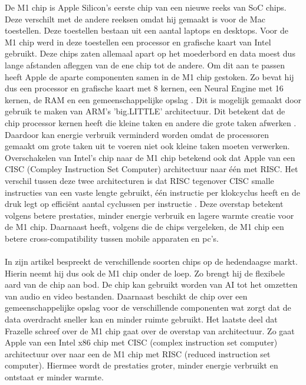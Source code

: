 \documentclass{hogent-article}
\begin{document}


De M1 chip is Apple Silicon's eerste chip van een nieuwe reeks van SoC chips. Deze verschilt met de andere reeksen omdat hij gemaakt is voor de Mac toestellen. Deze toestellen bestaan uit een aantal laptops en desktops. Voor de M1 chip werd in deze toestellen een processor en grafische kaart van Intel gebruikt. Deze chips zaten allemaal apart op het moederbord en data moest dus lange afstanden afleggen van de ene chip tot de andere. Om dit aan te passen heeft Apple de aparte componenten samen in de M1 chip gestoken. Zo bevat hij dus een processor en grafische kaart met 8 kernen, een Neural Engine met 16 kernen, de RAM en een gemeenschappelijke opslag \autocite{Apple2020}. Dit is mogelijk gemaakt door gebruik te maken van ARM's 'big.LITTLE' architectuur. Dit betekent dat de chip processor kernen heeft die kleine taken en andere die grote taken afwerken \autocite{ARM2014}. Daardoor kan energie verbruik verminderd worden omdat de processoren gemaakt om grote taken uit te voeren niet ook kleine taken moeten verwerken. \\
Overschakelen van Intel's chip naar de M1 chip betekend ook dat Apple van een CISC (Compley Instruction Set Computer) architectuur naar één met RISC. Het verschil tussen deze twee architecturen is dat RISC tegenover CISC smalle instructies van een vaste lengte gebruikt, één instructie per klokcyclus heeft en de druk legt op efficiënt aantal cyclussen per instructie \autocite{Thornton2018}. Deze overstap betekent volgens \textcite{Frazelle2021} betere prestaties, minder energie verbruik en lagere warmte creatie voor de M1 chip. Daarnaast heeft, volgens \textcite{Dalakoti2022} die de chips vergeleken, de M1 chip een betere cross-compatibility tussen mobile apparaten en pc's.
\\
\\
In zijn artikel bespreekt \textcite{Frazelle2021} de verschillende soorten chips op de hedendaagse markt. Hierin neemt hij dus ook de M1 chip onder de loep. Zo brengt hij de flexibele aard van de chip aan bod. De chip kan gebruikt worden van AI tot het omzetten van audio en video bestanden. Daarnaast beschikt de chip over een gemeenschappelijke opslag voor de verschillende componenten wat zorgt dat de data overdracht sneller kan en minder ruimte gebruikt. Het laatste deel dat Frazelle schreef over de M1 chip gaat over de overstap van architectuur. Zo gaat Apple van een Intel x86 chip met CISC (complex instruction set computer) architectuur over naar een de M1 chip met RISC (reduced instruction set computer). Hiermee wordt de prestaties groter, minder energie verbruikt en ontstaat er minder warmte. \\
\end{document}
